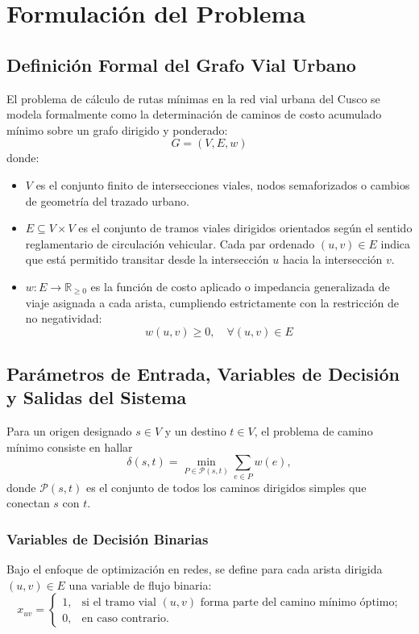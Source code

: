 \section{Formulación del Problema}
\label{sec:formulacion}

\subsection{Definición Formal del Grafo Vial Urbano}
El problema de cálculo de rutas mínimas en la red vial urbana del Cusco se modela formalmente como la determinación de caminos de costo acumulado mínimo sobre un grafo dirigido y ponderado:
\begin{equation}
    G = (V, E, w)
\end{equation}
donde:
\begin{itemize}
    \item $V$ es el conjunto finito de intersecciones viales, nodos semaforizados o cambios de geometría del trazado urbano.
    \item $E \subseteq V \times V$ es el conjunto de tramos viales dirigidos orientados según el sentido reglamentario de circulación vehicular. Cada par ordenado $(u, v) \in E$ indica que está permitido transitar desde la intersección $u$ hacia la intersección $v$.
    \item $w: E \to \mathbb{R}_{\ge 0}$ es la función de costo aplicado o impedancia generalizada de viaje asignada a cada arista, cumpliendo estrictamente con la restricción de no negatividad:
    \begin{equation}
        w(u, v) \ge 0, \quad \forall (u, v) \in E
    \end{equation}
\end{itemize}

\subsection{Parámetros de Entrada, Variables de Decisión y Salidas del Sistema}
Para un origen designado $s \in V$ y un destino $t \in V$, el problema de camino mínimo consiste en hallar
\begin{equation}
    \delta(s, t) = \min_{P \in \mathcal{P}(s, t)} \sum_{e \in P} w(e),
    \label{eq:objetivo}
\end{equation}
donde $\mathcal{P}(s, t)$ es el conjunto de todos los caminos dirigidos simples que conectan $s$ con $t$.

\subsubsection{Variables de Decisión Binarias}
Bajo el enfoque de optimización en redes, se define para cada arista dirigida $(u, v) \in E$ una variable de flujo binaria:
\begin{equation}
    x_{uv} = \begin{cases}
        1, & \text{si el tramo vial } (u, v) \text{ forma parte del camino mínimo óptimo;} \\
        0, & \text{en caso contrario.}
    \end{cases}
    \label{eq:variables}
\end{equation}

